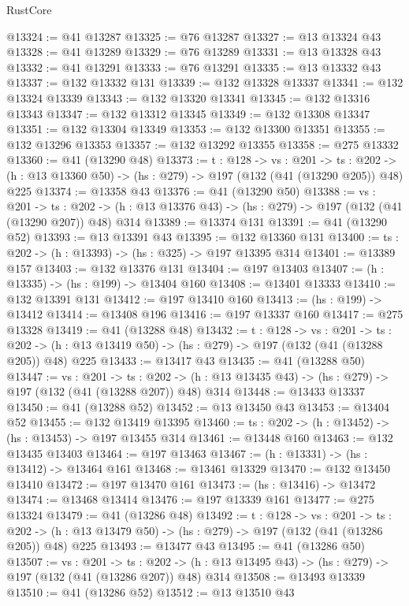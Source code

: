 \begin{lexlean}{RustCore}
\begin{coremodule}
@13324 := @41 @13287
@13325 := @76 @13287
@13327 := @13 @13324 @43
@13328 := @41 @13289
@13329 := @76 @13289
@13331 := @13 @13328 @43
@13332 := @41 @13291
@13333 := @76 @13291
@13335 := @13 @13332 @43
@13337 := @132 @13332 @131
@13339 := @132 @13328 @13337
@13341 := @132 @13324 @13339
@13343 := @132 @13320 @13341
@13345 := @132 @13316 @13343
@13347 := @132 @13312 @13345
@13349 := @132 @13308 @13347
@13351 := @132 @13304 @13349
@13353 := @132 @13300 @13351
@13355 := @132 @13296 @13353
@13357 := @132 @13292 @13355
@13358 := @275 @13332
@13360 := @41 (@13290 @48)
@13373 := {t : @128} ->
  {vs : @201} ->
  {ts : @202} -> (h : @13 @13360 @50) -> (hs : @279) -> @197 (@132 (@41 (@13290 @205)) @48) @225
@13374 := @13358 @43
@13376 := @41 (@13290 @50)
@13388 := {vs : @201} ->
  {ts : @202} -> (h : @13 @13376 @43) -> (hs : @279) -> @197 (@132 (@41 (@13290 @207)) @48) @314
@13389 := @13374 @131
@13391 := @41 (@13290 @52)
@13393 := @13 @13391 @43
@13395 := @132 @13360 @131
@13400 := {ts : @202} -> (h : @13393) -> (hs : @325) -> @197 @13395 @314
@13401 := @13389 @157
@13403 := @132 @13376 @131
@13404 := @197 @13403
@13407 := (h : @13335) -> (hs : @199) -> @13404 @160
@13408 := @13401 @13333
@13410 := @132 @13391 @131
@13412 := @197 @13410 @160
@13413 := (hs : @199) -> @13412
@13414 := @13408 @196
@13416 := @197 @13337 @160
@13417 := @275 @13328
@13419 := @41 (@13288 @48)
@13432 := {t : @128} ->
  {vs : @201} ->
  {ts : @202} -> (h : @13 @13419 @50) -> (hs : @279) -> @197 (@132 (@41 (@13288 @205)) @48) @225
@13433 := @13417 @43
@13435 := @41 (@13288 @50)
@13447 := {vs : @201} ->
  {ts : @202} -> (h : @13 @13435 @43) -> (hs : @279) -> @197 (@132 (@41 (@13288 @207)) @48) @314
@13448 := @13433 @13337
@13450 := @41 (@13288 @52)
@13452 := @13 @13450 @43
@13453 := @13404 @52
@13455 := @132 @13419 @13395
@13460 := {ts : @202} -> (h : @13452) -> (hs : @13453) -> @197 @13455 @314
@13461 := @13448 @160
@13463 := @132 @13435 @13403
@13464 := @197 @13463
@13467 := (h : @13331) -> (hs : @13412) -> @13464 @161
@13468 := @13461 @13329
@13470 := @132 @13450 @13410
@13472 := @197 @13470 @161
@13473 := (hs : @13416) -> @13472
@13474 := @13468 @13414
@13476 := @197 @13339 @161
@13477 := @275 @13324
@13479 := @41 (@13286 @48)
@13492 := {t : @128} ->
  {vs : @201} ->
  {ts : @202} -> (h : @13 @13479 @50) -> (hs : @279) -> @197 (@132 (@41 (@13286 @205)) @48) @225
@13493 := @13477 @43
@13495 := @41 (@13286 @50)
@13507 := {vs : @201} ->
  {ts : @202} -> (h : @13 @13495 @43) -> (hs : @279) -> @197 (@132 (@41 (@13286 @207)) @48) @314
@13508 := @13493 @13339
@13510 := @41 (@13286 @52)
@13512 := @13 @13510 @43

\end{coremodule}
\end{lexlean}
